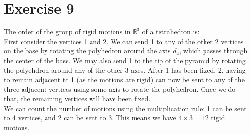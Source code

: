 \documentclass[12pt]{article}
\newcommand{\R}{\mathbb{R}}
\begin{document}
    
    \section*{Exercise 9}
    The order of the group of rigid motions in $\R^3$ of a tetrahedron is: \\
    First consider the vertices 1 and 2.
    We can send 1 to any of the other 2 vertices on the base by rotating the
    polyhedron around the axis $d_4$, which passes through the center of
    the base. We may also send 1 to the tip of the pyramid by rotating the
    polyehdron around any of the other 3 axes.
    After 1 has been fixed, 2, having to remain adjacent to 1 (as the
    motions are rigid) can now be sent to any of the three adjacent vertices
    using some axis to rotate the polyhedron. Once we do that, the
    remaining vertices will have been fixed. \\
    We can count the number of motions using the multiplication rule:
    1 can be sent to 4 vertices, and 2 can be sent to 3. This means we
    have $4 \times 3 = 12$ rigid motions. 
\end{document}
